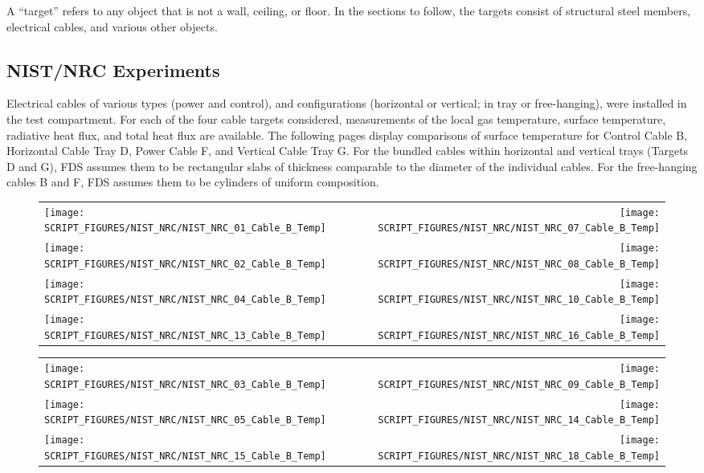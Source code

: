 A ``target'' refers to any object that is not a wall, ceiling, or floor. In the sections to follow, the targets consist of structural steel members, electrical cables, and various other objects.

\subsection{NIST/NRC Experiments}

Electrical cables of various types (power and control), and configurations (horizontal or vertical; in tray or free-hanging), were installed in the test compartment. For each of the four cable targets considered, measurements of the local gas temperature, surface temperature, radiative heat flux, and total heat flux are available.  The following pages display comparisons of surface temperature for Control Cable B, Horizontal Cable Tray D, Power Cable F, and Vertical Cable Tray G. For the bundled cables within horizontal and vertical trays (Targets D and G), FDS assumes them to be rectangular slabs of thickness comparable to the diameter of the individual cables. For the free-hanging cables B and F, FDS assumes them to be cylinders of uniform composition.

\newpage

\begin{figure}[p]
\begin{tabular*}{\textwidth}{l@{\extracolsep{\fill}}r}
\texttt{[image: SCRIPT\_FIGURES/NIST\_NRC/NIST\_NRC\_01\_Cable\_B\_Temp]} &
\texttt{[image: SCRIPT\_FIGURES/NIST\_NRC/NIST\_NRC\_07\_Cable\_B\_Temp]} \\
\texttt{[image: SCRIPT\_FIGURES/NIST\_NRC/NIST\_NRC\_02\_Cable\_B\_Temp]} &
\texttt{[image: SCRIPT\_FIGURES/NIST\_NRC/NIST\_NRC\_08\_Cable\_B\_Temp]} \\
\texttt{[image: SCRIPT\_FIGURES/NIST\_NRC/NIST\_NRC\_04\_Cable\_B\_Temp]} &
\texttt{[image: SCRIPT\_FIGURES/NIST\_NRC/NIST\_NRC\_10\_Cable\_B\_Temp]} \\
\texttt{[image: SCRIPT\_FIGURES/NIST\_NRC/NIST\_NRC\_13\_Cable\_B\_Temp]} &
\texttt{[image: SCRIPT\_FIGURES/NIST\_NRC/NIST\_NRC\_16\_Cable\_B\_Temp]}
\end{tabular*}
\label{NIST_NRC_Cable_B_Closed}
\end{figure}

\begin{figure}[p]
\begin{tabular*}{\textwidth}{l@{\extracolsep{\fill}}r}
\texttt{[image: SCRIPT\_FIGURES/NIST\_NRC/NIST\_NRC\_03\_Cable\_B\_Temp]} &
\texttt{[image: SCRIPT\_FIGURES/NIST\_NRC/NIST\_NRC\_09\_Cable\_B\_Temp]} \\
\texttt{[image: SCRIPT\_FIGURES/NIST\_NRC/NIST\_NRC\_05\_Cable\_B\_Temp]} &
\texttt{[image: SCRIPT\_FIGURES/NIST\_NRC/NIST\_NRC\_14\_Cable\_B\_Temp]} \\
\texttt{[image: SCRIPT\_FIGURES/NIST\_NRC/NIST\_NRC\_15\_Cable\_B\_Temp]} &
\texttt{[image: SCRIPT\_FIGURES/NIST\_NRC/NIST\_NRC\_18\_Cable\_B\_Temp]}
\end{tabular*}
\label{NIST_NRC_Cable_B_Open}
\end{figure}

